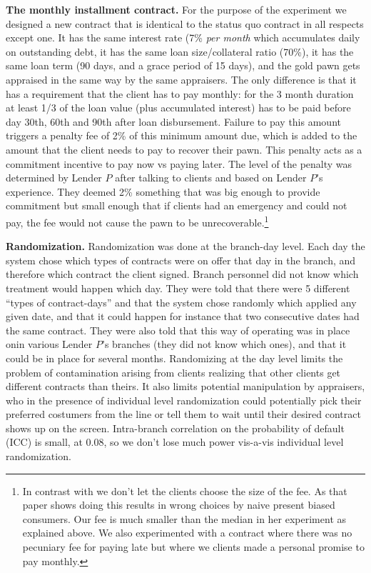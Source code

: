 \documentclass[11pt]{article}
\begin{document}
\vspace{.2in}
\noindent \textbf{The monthly installment contract.} For the purpose of the experiment we designed a new contract that is identical to the status quo contract in all respects except one. It has the same interest rate (7\% \textit{per month} which accumulates daily on outstanding debt, it has the same loan size/collateral ratio (70\%), it has the same loan term (90 days, and a grace period of 15 days), and the gold pawn gets appraised in the same way by the same appraisers. The only difference is that it has a requirement that the client has to pay monthly: for the 3 month duration at least 1/3 of the loan value (plus accumulated interest) has to be paid before day 30th, 60th and 90th after loan disbursement. Failure to pay this amount triggers a penalty fee of 2\% of this minimum amount due, which is added to the amount that the client needs to pay to recover their pawn. This penalty acts as a commitment incentive to pay now vs paying later. The level of the penalty was determined by Lender $P$ after talking to clients and based on Lender $P$'s experience. They deemed 2\% something that was big enough to provide commitment but small enough that if clients had an emergency and could not pay, the fee would not cause the pawn to be unrecoverable.\footnote{In contrast with \cite{John} we don't let the clients choose the size of the fee. As that paper shows doing this results in wrong choices by naive present biased consumers. Our fee is much smaller than the median in her experiment as explained above. We also experimented with a contract where there was no pecuniary fee for paying late but where we clients made a personal promise to pay monthly.}

\vspace{.2in}
\noindent \textbf{Randomization.} Randomization was done at the branch-day level.  Each day the system chose which types of contracts were on offer that day in the branch, and therefore which contract the client signed. Branch personnel did not know which treatment would happen which day. They were told that there were 5 different ``types of contract-days'' and that the system chose randomly which applied any given date, and that it could happen for instance that two consecutive dates had the same contract. They were also told that this way of operating was in place onin various Lender $P$'s branches (they did not know which ones), and that it could be in place for several months. Randomizing at the day level limits the problem of contamination arising from clients realizing that other clients get different contracts than theirs. It also limits potential  manipulation by appraisers, who in the presence of individual level randomization could potentially pick their preferred costumers from the line or tell them to wait until their desired contract shows up on the screen. Intra-branch correlation on the probability of default (ICC) is small, at 0.08, so we don't lose much power vis-a-vis individual level randomization.
\end{document}
